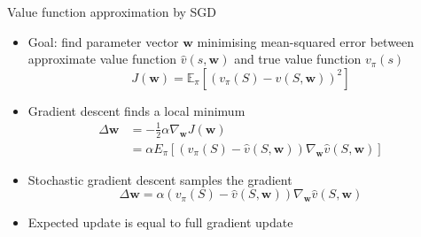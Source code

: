 \bgroup
\begin{frame}{Value function approximation by SGD}
\begin{itemize}
\item Goal: find parameter vector $\textbf{w}$ minimising mean-squared error between approximate value function $\hat{v}(s,\textbf{w})$ and true value function $v_{\pi}(s)$
\begin{equation*}
J(\textbf{w}) = \mathbb{E}_{\pi}[(v_{\pi}(S)-\hat{v}(S, \textbf{w}))^2]
\end{equation*}
\item Gradient descent finds a local minimum
\begin{align*}
\Delta\textbf{w} &= -\frac{1}{2}\alpha \nabla_{\textbf{w}}J(\textbf{w})\\
&= \alpha E_{\pi} [(v_{\pi}(S) - \hat{v}(S,\textbf{w}))\nabla_{\textbf{w}}\hat{v}(S,\textbf{w})]
\end{align*}
\item Stochastic gradient descent samples the gradient
\begin{equation*}
\Delta\textbf{w} = \alpha(v_{\pi}(S) - \hat{v}(S,\textbf{w}))\nabla_{\textbf{w}}\hat{v}(S,\textbf{w})
\end{equation*}
\item Expected update is equal to full gradient update
\end{itemize}
\end{frame}
\egroup